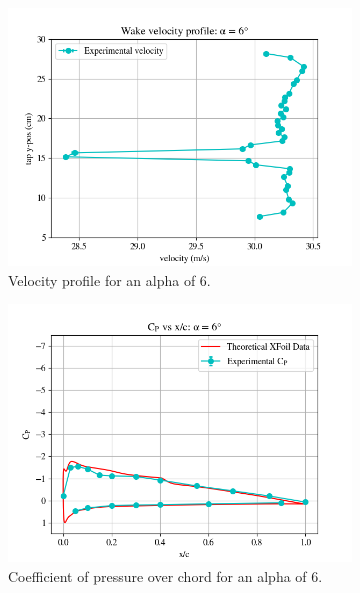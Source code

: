 \documentclass[11pt, letterpaper]{article}
\begin{document}
\begin{figure}[h]
  \begin{subfigure}{0.5\textwidth}
    \centering
    \includegraphics[width=1\linewidth]{Figures/vel-graphs/vel-a6.png}
    \caption{Velocity profile for an alpha of 6\degree.}
    \label{fig:vel-a6}
  \end{subfigure}%
  \begin{subfigure}{0.5\textwidth}
    \centering
    \includegraphics[width=1\textwidth]{Figures/C_p-a6.png}
    \caption{Coefficient of pressure over chord for an alpha of 6\degree.}
    \label{fig:C_p-a6}
  \end{subfigure}
\caption{}
  \label{fig:two1}
\end{figure}
\end{document}
